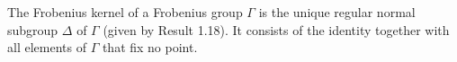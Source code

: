 The Frobenius kernel of a Frobenius group $\Gamma$ is the unique regular normal subgroup $\Delta$ of $\Gamma$ (given by Result 1.18). It consists of the identity together with all elements of $\Gamma$ that fix no point.
